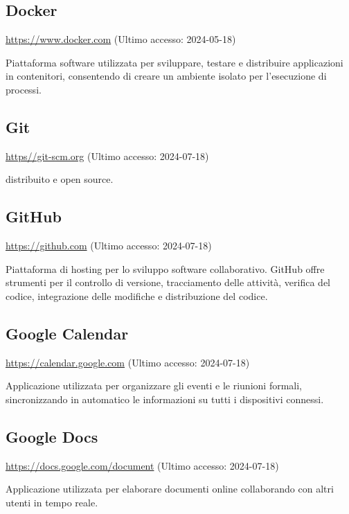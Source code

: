 \subsection{Docker}
\par \href{https://www.docker.com}{https://www.docker.com} (Ultimo accesso: 2024-05-18)
\par Piattaforma software utilizzata per sviluppare, testare e distribuire applicazioni in contenitori, consentendo di creare un ambiente isolato per l'esecuzione di processi.

\subsection{Git}
\par \href{https://git-scm.org}{https//git-scm.org} (Ultimo accesso: 2024-07-18)
\par {} distribuito e open source.

\subsection{GitHub}
\par \href{https://github.com}{https://github.com} (Ultimo accesso: 2024-07-18)
\par Piattaforma di hosting per lo sviluppo software collaborativo. GitHub offre strumenti per il controllo di versione, tracciamento delle attività, verifica del codice, integrazione delle modifiche e distribuzione del codice.
    
\subsection{Google Calendar}
\par \href{https://calendar.google.com}{https://calendar.google.com} (Ultimo accesso: 2024-07-18)
\par Applicazione utilizzata per organizzare gli eventi e le riunioni formali, sincronizzando in automatico le informazioni su tutti i dispositivi connessi.
    
\subsection{Google Docs}
\par \href{https://docs.google.com/document}{https://docs.google.com/document} (Ultimo accesso: 2024-07-18)
\par Applicazione utilizzata per elaborare documenti online collaborando con altri utenti in tempo reale.


